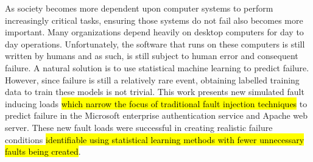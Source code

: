 As society becomes more dependent upon computer systems to perform increasingly
critical tasks, ensuring those systems do not fail also becomes more important.
Many organizations depend heavily on desktop computers for day to day
operations. Unfortunately, the software that runs on these computers is still
written by humans and as such, is still subject to human error and consequent
failure. A natural solution is to use statistical machine learning to predict
failure. However, since failure is still a relatively rare event, obtaining
labelled training data to train these models is not trivial. This work presents
new simulated fault inducing loads \hl{which narrow the focus of traditional
fault injection techniques} to predict failure in the Microsoft enterprise
authentication service and Apache web server.  These new fault loads were
successful in creating realistic failure conditions \hl{identifiable using
statistical learning methods with fewer unnecessary faults being created}.

